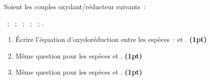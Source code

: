 Soient les couples oxydant/réducteur suivants~:

~;
~;
~;
~;
~;
.

\begin{enumerate}
    \item Écrire l'équation d'oxydoréduction entre les espèces~:
           et .
          \textbf{(1pt)}
    \item Même question pour les espèces  et
          .
          \textbf{(1pt)}
    \item Même question pour les espèces  et
          .
          \textbf{(1pt)}
\end{enumerate}
